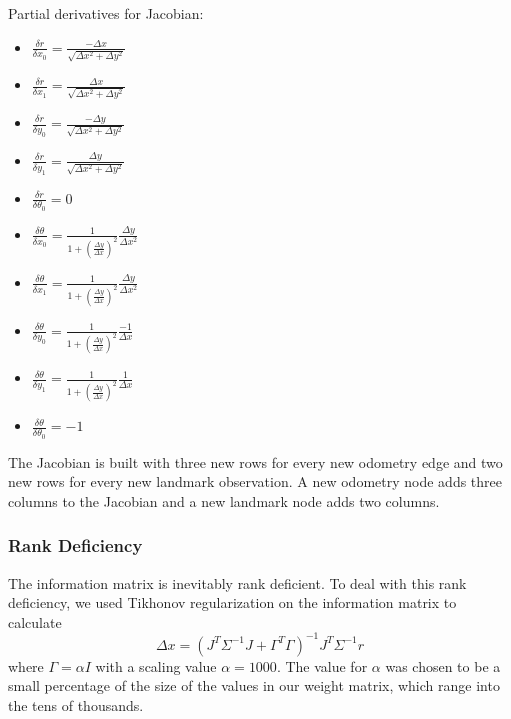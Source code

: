 \documentclass[12pt]{article}
\begin{document}
Partial derivatives for Jacobian:
\begin{multicols}{2}
\begin{itemize}
	\item $\frac{\delta r}{\delta x_0} = \frac{- \Delta x}{\sqrt{\Delta x^2 + \Delta y^2}}$
	\item $\frac{\delta r}{\delta x_1} = \frac{\Delta x}{\sqrt{\Delta x^2 + \Delta y^2}}$
	\item $\frac{\delta r}{\delta y_0} = \frac{-\Delta y}{\sqrt{\Delta x^2 + \Delta y^2}}$
	\item $\frac{\delta r}{\delta y_1} = \frac{\Delta y}{\sqrt{\Delta x^2 + \Delta y^2}}$
	\item $\frac{\delta r}{\delta \theta_0} = 0$
	\item $\frac{\delta \theta}{\delta x_0} = \frac{1}{1 + (\frac{\Delta y}{\Delta x})^2}\frac{\Delta y}{\Delta x^2}$
	\item $\frac{\delta \theta}{\delta x_1} = \frac{1}{1 + (\frac{\Delta y}{\Delta x})^2}\frac{\Delta y}{\Delta x^2}$
	\item $\frac{\delta \theta}{\delta y_0} = \frac{1}{1 + (\frac{\Delta y}{\Delta x})^2}\frac{-1}{\Delta x}$
	\item $\frac{\delta \theta}{\delta y_1} = \frac{1}{1 + (\frac{\Delta y}{\Delta x})^2}\frac{1}{\Delta x}$
	\item $\frac{\delta \theta}{\delta \theta_0} = -1$
\end{itemize}
\end{multicols}

The Jacobian is built with three new rows for every new odometry edge and two new rows for every new landmark observation.
A new odometry node adds three columns to the Jacobian and a new landmark node adds two columns.

\subsubsection*{Rank Deficiency}
The information matrix is inevitably rank deficient.  To deal with this rank deficiency, we used Tikhonov regularization on the information matrix to calculate
$$\Delta x = (J^T \Sigma^{-1}J + \Gamma^T \Gamma)^{-1}J^T \Sigma^{-1} r$$
where $\Gamma = \alpha I$ with a scaling value $\alpha = 1000$.  The value for $\alpha$ was chosen to be a small percentage of the size of the values in our weight matrix, which range into the tens of thousands.
\end{document}
